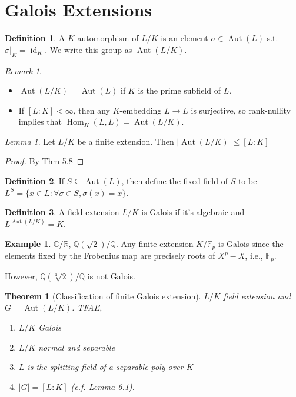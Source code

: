 \documentclass{article}
\theoremstyle{definition}
\newtheorem*{defn*}{Definition}
\newtheorem{example}[defn]{Example}
\theoremstyle{remark}
\newtheorem{rem}{Remark}
\newtheorem{lem}[defn]{Lemma}
\theoremstyle{plain}
\newtheorem{thm}[defn]{Theorem}
\newcommand{\QQ}{\mathbb{Q}}
\newcommand{\RR}{\mathbb{R}}
\newcommand{\CC}{\mathbb{C}}
\newcommand{\FF}{\mathbb{F}}
\newcommand{\Hom}{\operatorname{Hom}}
\newcommand{\Aut}{\operatorname{Aut}}
\begin{document}
\section{Galois Extensions}
\begin{defn*}
    A $K$-automorphism of $L/K$ is an element $\sigma\in\Aut(L)$ s.t. $\sigma|_K=\operatorname{id}_K$. We write this group as $\Aut(L/K)$.
\end{defn*}
\begin{rem}
    \begin{itemize}
        \item $\Aut(L/K)=\Aut(L)$ if $K$ is the prime subfield of $L$.
        \item If $[L:K]<\infty$, then any $K$-embedding $L\to L$ is surjective, so rank-nullity implies that $\Hom_K(L,L)=\Aut(L/K)$.
    \end{itemize}
\end{rem}
\begin{lem}
    Let $L/K$ be a finite extension. Then $|\Aut(L/K)|\le [L:K]$
\end{lem}
\begin{proof}
    By Thm 5.8
\end{proof}
\begin{defn*}
    If $S\subseteq\Aut(L)$, then define the fixed field of $S$ to be $L^S=\{x\in L:\forall\sigma\in S,\sigma(x)=x\}$.
\end{defn*}
\begin{defn*}
    A field extension $L/K$ is Galois if it's algebraic and $L^{\Aut(L/K)}=K$.
\end{defn*}
\begin{example}
    $\CC/\RR$, $\QQ(\sqrt{2})/\QQ$. Any finite extension $K/\FF_p$ is Galois since the elements fixed by the Frobenius map are precisely roots of $X^p-X$, i.e., $\FF_p$.

    However, $\QQ(\sqrt[3]{2})/\QQ$ is not Galois.
\end{example}
\begin{thm}[Classification of finite Galois extension]
    $L/K$ field extension and $G=\Aut(L/K)$. TFAE,
    \begin{enumerate}
        \item $L/K$ Galois
        \item $L/K$ normal and separable
        \item $L$ is the splitting field of a separable poly over $K$
        \item $|G|=[L:K]$ (c.f. Lemma 6.1).
    \end{enumerate}
\end{thm}
\end{document}
